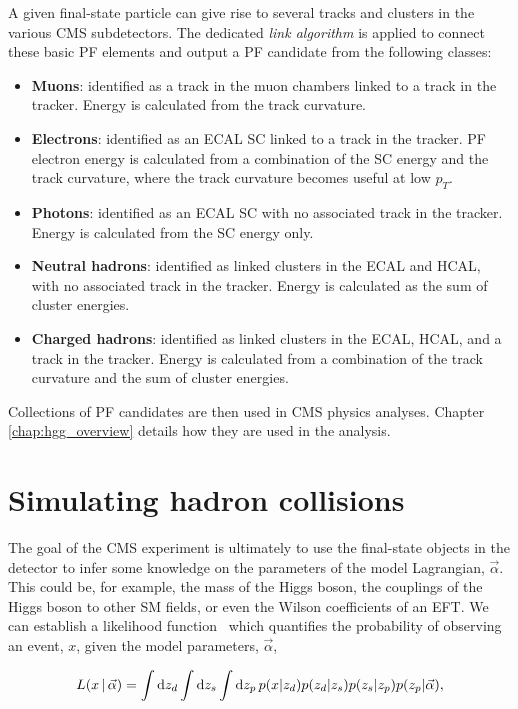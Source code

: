 A given final-state particle can give rise to several tracks and clusters in the various CMS subdetectors. The dedicated \textit{link algorithm} is applied to connect these basic PF elements and output a PF candidate from the following classes:
\begin{itemize}
    \item \textbf{Muons}: identified as a track in the muon chambers linked to a track in the tracker. Energy is calculated from the track curvature.
    \item \textbf{Electrons}: identified as an ECAL SC linked to a track in the tracker. PF electron energy is calculated from a combination of the SC energy and the track curvature, where the track curvature becomes useful at low $p_T$. 
    \item \textbf{Photons}: identified as an ECAL SC with no associated track in the tracker. Energy is calculated from the SC energy only.
    \item \textbf{Neutral hadrons}: identified as linked clusters in the ECAL and HCAL, with no associated track in the tracker. Energy is calculated as the sum of cluster energies.
    \item \textbf{Charged hadrons}: identified as linked clusters in the ECAL, HCAL, and a track in the tracker. Energy is calculated from a combination of the track curvature and the sum of cluster energies.
\end{itemize}
\noindent
Collections of PF candidates are then used in CMS physics analyses. Chapter \ref{chap:hgg_overview} details how they are used in the \Hgg analysis.

\section{Simulating hadron collisions}\label{sec:mc}
The goal of the CMS experiment is ultimately to use the final-state objects in the detector to infer some knowledge on the parameters of the model Lagrangian, $\vec{\alpha}$. This could be, for example, the mass of the Higgs boson, the couplings of the Higgs boson to other SM fields, or even the Wilson coefficients of an EFT. We can establish a likelihood function~\cite{Brehmer:2020cvb} which quantifies the probability of observing an event, $x$, given the model parameters, $\vec{\alpha}$,

\begin{equation}\label{eq:mc_integral}
    L(x\,|\,\vec{\alpha}) = \int {\rm{d}}z_d \int {\rm{d}}z_s \int {\rm{d}}z_p \, p(x|z_d)p(z_d|z_s)p(z_s|z_p)p(z_p|\vec{\alpha}),
\end{equation}

